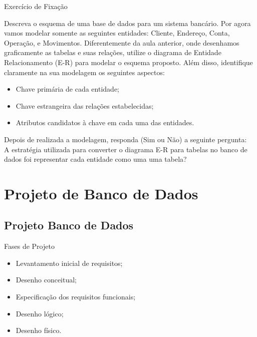 \documentclass[xcolor=x11names,compress]{beamer}
\begin{document}
\begin{frame}[allowframebreaks]{Exercício de Fixação}

Descreva o esquema de uma base de dados para um sistema bancário. Por agora vamos modelar somente as seguintes entidades: Cliente, Endereço, Conta, Operação, e Movimentos. Diferentemente da aula anterior, onde desenhamos graficamente as tabelas e suas relações, utilize o diagrama de Entidade Relacionamento (E-R) para modelar o esquema proposto. Além disso, identifique claramente na sua modelagem os seguintes aspectos:

\begin{itemize}
\itemsep 5mm

\item Chave primária de cada entidade;

\item Chave estrangeira das relações estabelecidas;

\item Atributos candidatos à chave em cada uma das entidades.

\end{itemize}

Depois de realizada a modelagem, responda (Sim ou Não) a seguinte pergunta: \\[5mm]

A estratégia utilizada para converter o diagrama E-R para tabelas no banco de dados foi representar cada entidade como uma uma tabela?

\end{frame}

\section[Projeto BD]{Projeto de Banco de Dados}
\subsection{Projeto Banco de Dados}
\begin{frame}{Fases de Projeto}

\begin{itemize}

\item Levantamento inicial de requisitos;

\item Desenho conceitual;

\item Especificação dos requisitos funcionais;

\item Desenho lógico;

\item Desenho físico.

\end{itemize}

\end{frame}
\end{document}
